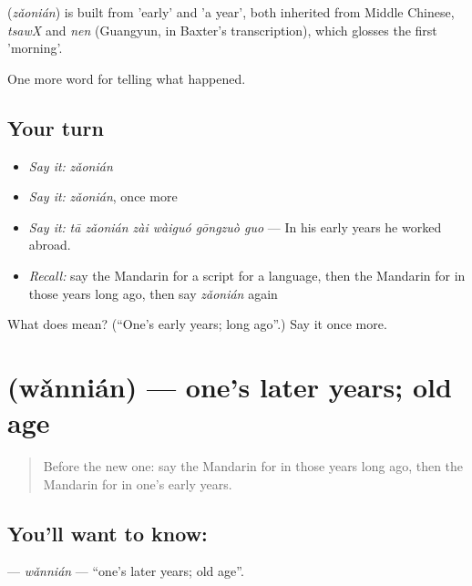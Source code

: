 \begin{cousinweb}
\textbf{} (\emph{zǎonián}) is built from  'early' and  'a year', both inherited from Middle Chinese, \emph{tsawX} and \emph{nen} (Guangyun, in Baxter's transcription), which glosses the first 'morning'.
\end{cousinweb}

\begin{grammarlens}[title={What you've built}]
One more word for telling what happened.
\end{grammarlens}

\subsection*{Your turn}
\begin{itemize}
\raggedright
  \item \emph{Say it:} \emph{zǎonián}
  \item \emph{Say it:} \emph{zǎonián}, once more
  \item \emph{Say it:} \emph{tā zǎonián zài wàiguó gōngzuò guo} — In his early years he worked abroad.
  \item \emph{Recall:} say the Mandarin for a script for a language, then the Mandarin for in those years long ago, then say \emph{zǎonián} again
\end{itemize}

\begin{tcolorbox}[breakable,colback=teal!4,colframe=teal!35!black,title={Before you move on}]
What does  mean? (\textquotedblleft{}One's early years; long ago\textquotedblright{}.) Say it once more.
\end{tcolorbox}
\section[\texorpdfstring{\zh{晚年} (wǎnnián)}{晚年 (wǎnnián)}]{ (wǎnnián) — one's later years; old age}

\label{lesson:ZH-C322-wannian}



\begin{quote}
Before the new one: say the Mandarin for in those years long ago, then the Mandarin for in one's early years.
\end{quote}

\subsection*{You'll want to know: }
\textbf{} — \emph{wǎnnián} — \textquotedblleft{}one's later years; old age\textquotedblright{}.

